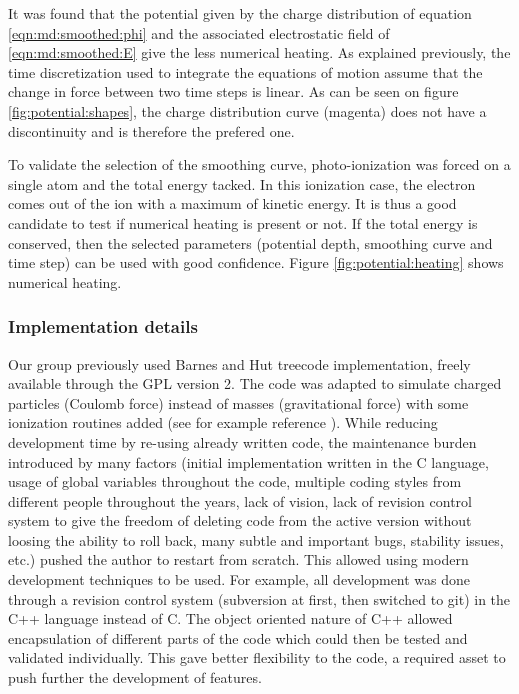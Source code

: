 It was found that the potential given by the charge distribution of equation
\eqref{eqn:md:smoothed:phi} and the associated electrostatic field of
\eqref{eqn:md:smoothed:E} give the less numerical heating. As explained
previously, the time discretization used to integrate the equations of motion
assume that the change in force between two time steps is linear. As can be
seen on figure \ref{fig:potential:shapes}, the charge distribution curve
(magenta) does not have a discontinuity and is therefore the prefered one.

To validate the selection of the smoothing curve, photo-ionization was forced
on a single atom and the total energy tacked. In this ionization case, the
electron comes out of the ion with a maximum of kinetic energy. It is thus a
good candidate to test if numerical heating is present or not. If the total
energy is conserved, then the selected parameters (potential depth, smoothing
curve and time step) can be used with good confidence. Figure
\ref{fig:potential:heating} shows numerical heating.




\subsubsection{Implementation details}

Our group previously used Barnes and Hut treecode implementation,
freely available\cite{treecode} through the GPL version 2. The code was adapted
to simulate charged particles (Coulomb force) instead of masses (gravitational
force) with some ionization routines added (see for example reference
\cite{Jungreuthmayer2005}). While reducing development time by re-using already
written code, the maintenance burden introduced by many factors (initial
implementation written in the C language, usage of global variables
throughout the code, multiple coding styles from different people throughout
the years, lack of vision, lack of revision control system to give the freedom
of deleting code from the active version without loosing the ability to roll
back, many subtle and important bugs, stability issues, etc.) pushed the author
to restart from scratch. This allowed using modern development techniques to be
used. For example, all development was done through a revision control system
(subversion\cite{svn} at first, then switched to git\cite{git}) in the C++
language instead of C. The object oriented nature of C++ allowed encapsulation
of different parts of the code which could then be tested and validated
individually. This gave better flexibility to the code, a required asset to
push further the development of features.

